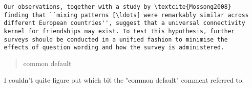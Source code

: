 \documentclass{scrartcl}
\begin{document}
\begin{lstlisting}
Our observations, together with a study by \textcite{Mossong2008} finding that ``mixing patterns [\ldots] were remarkably similar across different European countries'', suggest that a universal connectivity kernel for friendships may exist. To test this hypothesis, further surveys should be conducted in a unified fashion to minimise the effects of question wording and how the survey is administered.
\end{lstlisting}

\begin{quote}
    common default
\end{quote}

I couldn't quite figure out which bit the "common default" comment referred to.
\end{document}
